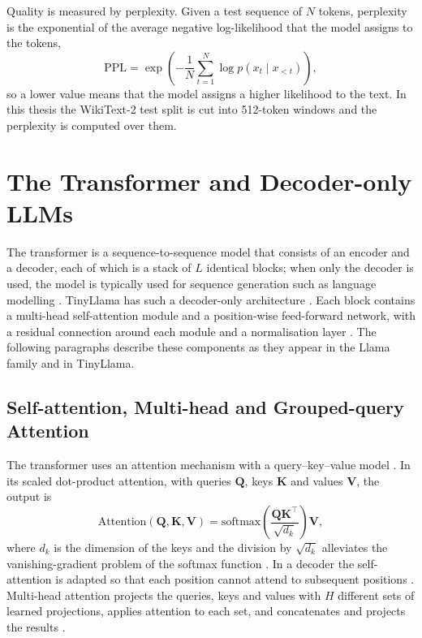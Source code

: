 \documentclass[
11pt, %
english, %
singlespacing, %
headsepline, %
]{MastersDoctoralThesis} %
\begin{document}
Quality is measured by perplexity. Given a test sequence of $N$ tokens, perplexity is the exponential of the average negative log-likelihood that the model assigns to the tokens,
\begin{equation}
  \mathrm{PPL} = \exp\left( -\frac{1}{N} \sum_{t=1}^{N} \log p(x_t \mid x_{<t}) \right),
  \label{eq:ch2-ppl}
\end{equation}
so a lower value means that the model assigns a higher likelihood to the text. In this thesis the WikiText-2 test split is cut into 512-token windows and the perplexity is computed over them.

\section{The Transformer and Decoder-only LLMs}
\label{sec:ch2-transformer}

The transformer is a sequence-to-sequence model that consists of an encoder and a decoder, each of which is a stack of $L$ identical blocks; when only the decoder is used, the model is typically used for sequence generation such as language modelling \cite{lin2021survey}. TinyLlama has such a decoder-only architecture \cite{zhang2024tinyllama}. Each block contains a multi-head self-attention module and a position-wise feed-forward network, with a residual connection around each module and a normalisation layer \cite{lin2021survey}. The following paragraphs describe these components as they appear in the Llama family and in TinyLlama.

\subsection{Self-attention, Multi-head and Grouped-query Attention}
\label{sec:ch2-attention}

The transformer uses an attention mechanism with a query--key--value model \cite{lin2021survey}. In its scaled dot-product attention, with queries $\mathbf{Q}$, keys $\mathbf{K}$ and values $\mathbf{V}$, the output is
\begin{equation}
  \mathrm{Attention}(\mathbf{Q}, \mathbf{K}, \mathbf{V}) = \mathrm{softmax}\left( \frac{\mathbf{Q}\mathbf{K}^{\top}}{\sqrt{d_k}} \right) \mathbf{V},
  \label{eq:ch2-attn}
\end{equation}
where $d_k$ is the dimension of the keys and the division by $\sqrt{d_k}$ alleviates the vanishing-gradient problem of the softmax function \cite{lin2021survey}. In a decoder the self-attention is adapted so that each position cannot attend to subsequent positions \cite{lin2021survey}. Multi-head attention projects the queries, keys and values with $H$ different sets of learned projections, applies attention to each set, and concatenates and projects the results \cite{lin2021survey}.
\end{document}
